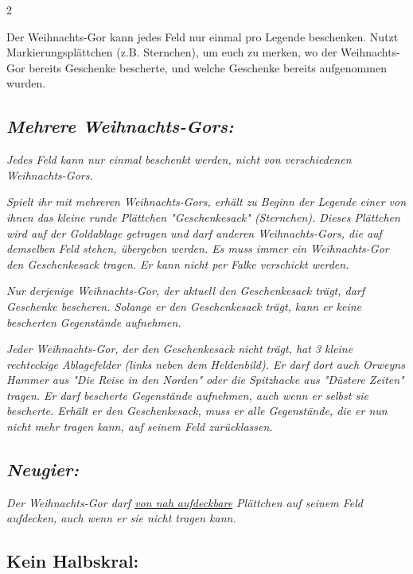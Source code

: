 \documentclass[10pt, a4paper, oneside]{book}
\newcommand{\fan}[1]{\textit{#1}}
\begin{document}
\begin{multicols*}{2}
\begin{nobgcolor}
Der Weihnachts-Gor kann jedes Feld nur einmal pro Legende beschenken. Nutzt Markierungsplättchen (z.B. Sternchen), um euch zu merken, wo der Weihnachts-Gor bereits Geschenke bescherte, und welche Geschenke bereits aufgenommen wurden.






\subsection{\fan{Mehrere Weihnachts-Gors:}}

\fan{Jedes Feld kann nur einmal beschenkt werden, nicht von verschiedenen Weihnachts-Gors.}


\fan{Spielt ihr mit mehreren Weihnachts-Gors, erhält zu Beginn der Legende einer von ihnen das kleine runde Plättchen "Geschenkesack" (Sternchen). Dieses Plättchen wird auf der Goldablage getragen und darf anderen Weihnachts-Gors, die auf demselben Feld stehen, übergeben werden. Es muss immer ein Weihnachts-Gor den Geschenkesack tragen. Er kann nicht per Falke verschickt werden.}

\fan{Nur derjenige Weihnachts-Gor, der aktuell den Geschenkesack trägt, darf Geschenke bescheren. Solange er den Geschenkesack trägt, kann er keine bescherten Gegenstände aufnehmen.}

\fan{Jeder Weihnachts-Gor, der den Geschenkesack nicht trägt, hat 3 kleine rechteckige Ablagefelder (links neben dem Heldenbild). Er darf dort auch Orweyns Hammer aus "Die Reise in den Norden" oder die Spitzhacke aus "Düstere Zeiten" tragen. Er darf bescherte Gegenstände aufnehmen, auch wenn er selbst sie bescherte. Erhält er den Geschenkesack, muss er alle Gegenstände, die er nun nicht mehr tragen kann, auf seinem Feld zurücklassen.}


\columnbreak


\subsection{\fan{Neugier:}}

\fan{Der Weihnachts-Gor darf \hyperref[aufdecken]{von nah aufdeckbare} Plättchen auf seinem Feld aufdecken, auch wenn er sie nicht tragen kann.}





\subsection{Kein Halbskral:}


\end{nobgcolor}
\end{multicols*}
\end{document}
